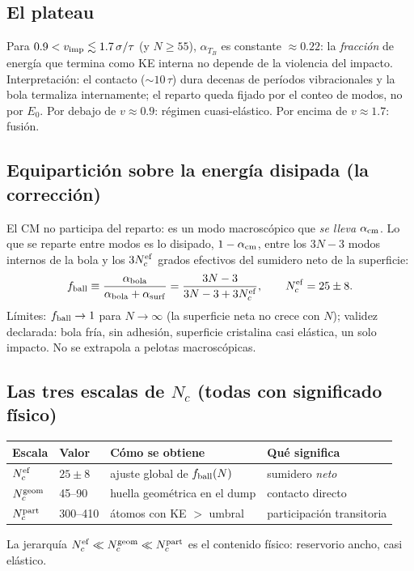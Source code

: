 \documentclass[11pt]{article}
\begin{document}
\subsection{El plateau}
Para $0.9<v_{\rm imp}\lesssim1.7\,\sigma/\tau$ (y $N\ge55$),
$\alpha_{T_B}$ es constante $\approx0.22$: la \emph{fracción} de energía
que termina como KE interna no depende de la violencia del impacto.
Interpretación: el contacto ($\sim10\,\tau$) dura decenas de períodos
vibracionales y la bola termaliza internamente; el reparto queda fijado
por el conteo de modos, no por $E_0$. Por debajo de $v\approx0.9$:
régimen cuasi-elástico. Por encima de $v\approx1.7$: fusión.

\subsection{Equipartición sobre la energía disipada (la corrección)}
El CM no participa del reparto: es un modo macroscópico que \emph{se
lleva} $\alpha_{\rm cm}$. Lo que se reparte entre modos es lo disipado,
$1-\alpha_{\rm cm}$, entre los $3N-3$ modos internos de la bola y los
$3N_c^{\rm ef}$ grados efectivos del sumidero neto de la superficie:
\[ f_{\rm ball}\equiv
   \frac{\alpha_{\rm bola}}{\alpha_{\rm bola}+\alpha_{\rm surf}}
   =\frac{3N-3}{3N-3+3N_c^{\rm ef}},\qquad N_c^{\rm ef}=25\pm8. \]
Límites: $f_{\rm ball}\to1$ para $N\to\infty$ (la superficie neta no
crece con $N$); validez declarada: bola fría, sin adhesión, superficie
cristalina casi elástica, un solo impacto. No se extrapola a pelotas
macroscópicas.

\subsection{Las tres escalas de $N_c$ (todas con significado físico)}
\begin{center}
\begin{tabular}{llll}
\toprule
Escala & Valor & Cómo se obtiene & Qué significa \\
\midrule
$N_c^{\rm ef}$   & $25\pm8$    & ajuste global de $f_{\rm ball}(N)$ & sumidero \emph{neto} \\
$N_c^{\rm geom}$ & 45--90      & huella geométrica en el dump       & contacto directo \\
$N_c^{\rm part}$ & 300--410    & átomos con KE $>$ umbral           & participación transitoria \\
\bottomrule
\end{tabular}
\end{center}
La jerarquía $N_c^{\rm ef}\ll N_c^{\rm geom}\ll N_c^{\rm part}$ es el
contenido físico: reservorio ancho, casi elástico.
\end{document}
